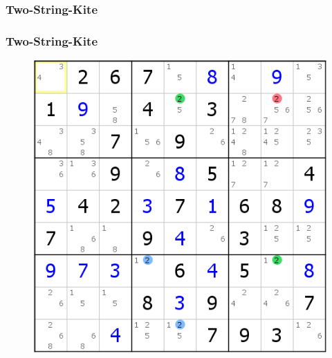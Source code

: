 \documentclass[accentcolor=tud6b,colorbacktitle,inverttitle,landscape,german,presentation,t]{tudbeamer}
\begin{document}
		\subsubsection{Two-String-Kite}
			\begin{frame}
			\frametitle{Two-String-Kite}
			\begin{figure}[Hh]
    			\includegraphics[width=\textwidth,height=\textheight-10pt,keepaspectratio]{./img/2stringkite.png}
			\end{figure}
			\end{frame}
\end{document}
